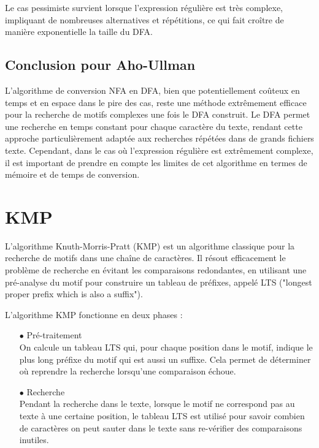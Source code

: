 \documentclass[11pt,english]{article}
\begin{document}
Le cas pessimiste survient lorsque l'expression régulière est très complexe, impliquant de nombreuses alternatives et répétitions, ce qui fait croître de manière exponentielle la taille du DFA.

\subsection{Conclusion pour Aho-Ullman}

L'algorithme de conversion NFA en DFA, bien que potentiellement coûteux en temps et en espace dans le pire des cas, reste une méthode extrêmement efficace pour la recherche de motifs complexes une fois le DFA construit. Le DFA permet une recherche en temps constant pour chaque caractère du texte, rendant cette approche particulièrement adaptée aux recherches répétées dans de grands fichiers texte. Cependant, dans le cas où l'expression régulière est extrêmement complexe, il est important de prendre en compte les limites de cet algorithme en termes de mémoire et de temps de conversion.


\section{KMP}

\indent

L'algorithme Knuth-Morris-Pratt (KMP) est un algorithme classique pour la recherche de motifs dans une chaîne de caractères. Il résout efficacement le problème de recherche en évitant les comparaisons redondantes, en utilisant une pré-analyse du motif pour construire un tableau de préfixes, appelé LTS ("longest proper prefix which is also a suffix").

\indent L'algorithme KMP fonctionne en deux phases :

\begin{itemize}
    \item [$\bullet$] Pré-traitement
    \\
    On calcule un tableau LTS qui, pour chaque position dans le motif, indique le plus long préfixe du motif qui est aussi un suffixe. Cela permet de déterminer où reprendre la recherche lorsqu'une comparaison échoue.
    
    \item [$\bullet$] Recherche
    \\
    Pendant la recherche dans le texte, lorsque le motif ne correspond pas au texte à une certaine position, le tableau LTS est utilisé pour savoir combien de caractères on peut sauter dans le texte sans re-vérifier des comparaisons inutiles.
\end{itemize}
\end{document}
